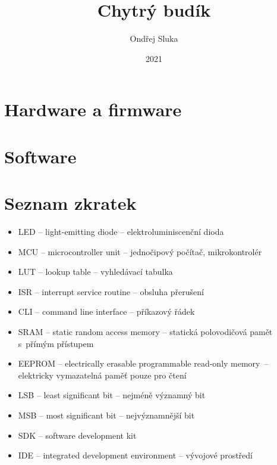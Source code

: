\documentclass[12pt,a4paper]{article}
\title{Chytrý budík}
\author{Ondřej Sluka}
\date{2021}  %
\begin{document}
\maketitle  %

\tableofcontents



\clearpage
\section{Hardware a firmware} %


%

\clearpage
\section{Software}  %


\printbibliography[title={Odkazy a~literatura}]  %


\section*{Seznam zkratek}
\begin{itemize}
    \item LED -- light-emitting diode -- elektroluminiscenční dioda
    \item MCU -- microcontroller unit -- jednočipový počítač, mikrokontrolér
    \item LUT -- lookup table -- vyhledávací tabulka
    \item ISR -- interrupt service routine -- obsluha přerušení
    \item CLI -- command line interface -- příkazový řádek
    \item SRAM -- static random access memory -- statická polovodičová pamět
          s~přímým přístupem
    \item EEPROM -- electrically erasable programmable read-only memory~--
          elektricky vymazatelná paměť pouze pro čtení
    \item LSB -- least significant bit -- nejméně významný bit
    \item MSB -- most significant bit -- nejvýznamnější bit
    \item SDK -- software development kit
    \item IDE -- integrated development environment -- vývojové prostředí
\end{itemize}
\end{document}
